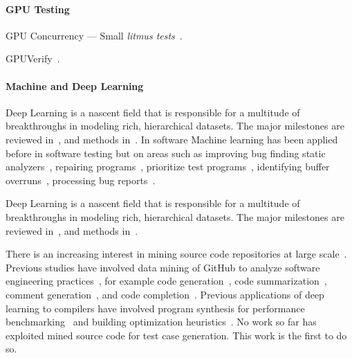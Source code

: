 






\paragraph{GPU Testing}  GPU Concurrency --- Small \emph{litmus tests}~\cite{Alglave2015}.

GPUVerify~\cite{Bardsley2014}.


\paragraph{Machine and Deep Learning}
Deep Learning is a nascent field that is responsible for a multitude of breakthroughs in modeling rich, hierarchical datasets. The major milestones are reviewed in~\cite{Wang2017}, and methods in~\cite{Schmidhuber2014}. In software 
Machine learning has been applied before in software testing but on areas such as improving bug finding static analyzers~\cite{Heo2017,Koc2017}, repairing programs~\cite{Koukoutos2017a,White}, prioritize test programs~\cite{Chen2017}, identifying buffer overruns~\cite{Choi2016}, processing bug reports~\cite{Lam2016,Huo2016}.

Deep Learning is a nascent field that is responsible for a multitude of breakthroughs in modeling rich, hierarchical datasets. The major milestones are reviewed in~\cite{Wang2017}, and methods in~\cite{Schmidhuber2014}.


There is an increasing interest in mining source code repositories at large scale~\cite{Allamanis2013a,White2015a,Bird2009}. Previous studies have involved data mining of GitHub to analyze software engineering practices~\cite{Wu2014,Guzman2014,Baishakhi2014a,Vasilescu2015}, for example code generation~\cite{Zhang2015a}, code summarization~\cite{Allamanis2016}, comment generation~\cite{Wong2013}, and code completion~\cite{Raychev2014}. Previous applications of deep learning to compilers have involved program synthesis for performance benchmarking~\cite{Cummins2017a} and building optimization heuristics~\cite{Cummins2017b}. No work so far has exploited mined source code for test case generation. This work is the first to do so.
